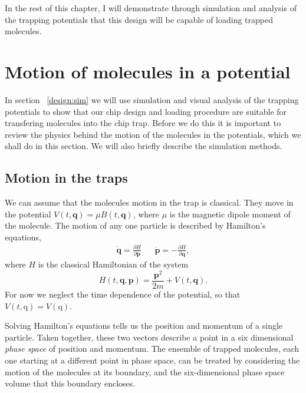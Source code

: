 In the rest of this chapter, I will demonstrate through simulation and analysis
of the trapping potentials that this design will be capable of loading trapped
\CaF{} molecules.

\section{Motion of molecules in a potential}

In section ~\ref{design:sim} we will use simulation and visual analysis of the
trapping potentials to show that our chip design and loading procedure are
suitable for transfering molecules into the chip trap. Before we do this it is
important to review the physics behind the motion of the molecules in the
potentials, which we shall do in this section. We will also briefly describe
the simulation methods.

\subsection{Motion in the traps}
\label{desgin:motion}

We can assume that the molecules motion in the trap is classical. They move in
the potential $V(t, \mathbf{q}) = \mu B(t, \mathbf{q})$, where $\mu$ is the
magnetic dipole moment of the molecule.  The motion of any one particle is
described by Hamilton's equations,~\cite{Lichtenberg1969}
%
\begin{align}
  \label{design:eq:hamilton}
  \dot{\mathbf{q}} =  \frac{\partial H}{\partial \mathbf{p}} &&
  \dot{\mathbf{p}} = -\frac{\partial H}{\partial \mathbf{q}},
\end{align}
%
where $H$ is the classical Hamiltonian of the system
\begin{equation}
  H(t, \mathbf{q}, \mathbf{p}) = \frac{\mathbf{p}^2}{2m} + V(t, \mathbf{q}).
\end{equation}
For now we neglect the time dependence of the potential, so that $V(t,
\mathrm{q}) = V(\mathrm{q})$.

Solving Hamilton's equations tells us the position and momentum of a single
particle. Taken together, these two vectors describe a point in a six
dimensional \emph{phase space} of position and momentum. The ensemble of
trapped molecules, each one starting at a different point in phase space, can
be treated by considering the motion of the molecules at its
boundary, and the  six-dimensional phase space volume that this
boundary encloses.~\cite{Hand1998}

